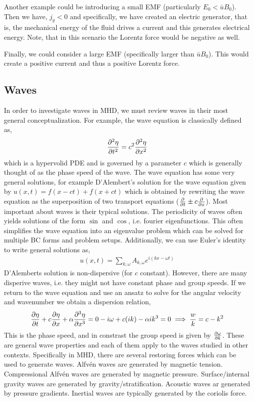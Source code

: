 \documentclass{article}
\begin{document}
Another example could be introducing a small EMF (particularly $E_0 <
\bar{u}B_0$). Then we have, $j_y < 0$ and specifically, we have created an
electric generator, that is, the mechanical energy of the fluid drives a current
and this generates electrical energy. Note, that in this scenario the Lorentz
force would be negative as well. 

Finally, we could consider a large EMF (specifically larger than $\bar{u}B_0$).
This would create a positive current and thus a positive Lorentz force. 

\subsection{Waves}
In order to investigate waves in MHD, we must review waves in their most general
conceptualization. For example, the wave equation is classically defined as, 
\begin{gather*}
    \frac{\partial^2 \eta}{\partial t^2} = c^2\frac{\partial^2 \eta}{\partial x^2}
\end{gather*}
which is a hypervolid PDE and is governed by a parameter $c$ which is generally
thought of as the phase speed of the wave. The wave equation has some very
general solutions, for example D'Alembert's solution for the wave equation given
by $u(x,t) = f(x-ct) + f(x + ct)$ which is obtained by rewriting the wave
equation as the superposition of two transport equations ($\frac{\partial }{\partial t} \pm c\frac{\partial }{\partial x}$).
Most important about waves is their typical solutions. The periodicity of waves
often yields solutions of the form $\sin$ and $\cos$, i.e. fourier
eigenfunctions. This often simplifies the wave equation into an eigenvalue
problem which can be solved for multiple BC forms and problem setups.
Additionally, we can use Euler's identity to write general solutions as, 
\begin{gather*}
    u(x,t) = \sum_{k,\omega} A_{k,\omega}e^{i(kx - \omega t)}
\end{gather*}
D'Alemberts solution is non-dispersive (for $c$ constant). However, there are
many disperive waves, i.e. they might not have constant phase and group speeds.
If we return to the wave equation and use an ansatz to solve for the angular
velocity and wavenumber we obtain a dispersion relation, 
\begin{gather*}
    \frac{\partial \eta}{\partial t} + c\frac{\partial \eta}{\partial x} +\alpha\frac{\partial ^3\eta}{\partial x^3} = 0
    -i\omega + c(ik) - \alpha ik^3 = 0 \implies \frac{w}{k} = c - k^2
\end{gather*}
This is the phase speed, and in constrast the group speed is given by
$\frac{\partial \omega}{\partial k}$. These are general wave properties and each of them apply to
the waves studied in other contexts. Specifically in MHD, there are several
restoring forces which can be used to generate waves. Alfv\'en waves are generated
by magnetic tension. Compressional Alfv\'en waves are generated by magnetic
pressure. Surface/internal gravity waves are generated by
gravity/stratification. Acoustic waves ar generated by pressure gradients.
Inertial waves are typically generated by the coriolis force. 
\end{document}
